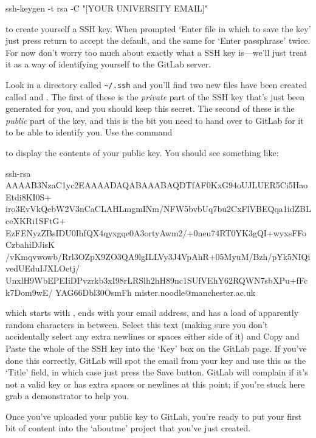\begin{ttoutenv}
ssh-keygen -t rsa -C "[YOUR UNIVERSITY EMAIL]"
\end{ttoutenv}

to create yourself a SSH key. When prompted `Enter file in which to save the key' just press return to accept the default, and the same for `Enter passphrase' twice.  For now don't worry too much about exactly what a SSH key is---we'll just treat it as a way of identifying yourself to the GitLab server. 

Look in a directory called \verb!~/.ssh! and you'll find two new files have been created called  and . The first of these is the \textit{private} part of the SSH key that's just been generated for you, and you should keep this secret. The second of these is the \textit{public} part of the key, and this is the bit you need to hand over to GitLab for it to be able to identify you. Use the command

to display the contents of your public key. You should see something like:

\begin{ttoutenv}
  
  ssh-rsa  AAAAB3NzaC1yc2EAAAADAQABAAABAQDTfAF0KxG94oUJLUER5Ci5HaoEtdi8KI0S+
  iro3EvVkQebW2V3nCaCLAHLmgmINm/NFW5bvbUq7bu2CxFlVBEQqa1idZBLceXKRi1SFtG+
  EzFENyzZBsIDU0IhfQX4qyxgqe0A3ortyAwm2/+0neu74RT0YK3gQI+wyxsFFoCzbahiDJisK
  /vKmqvwowb/Rrl3OZpX9ZO3QA9lgILLVy3J4VpAhR+05MyuM/Bzh/pYk5NIQivedUEduIJXLOetj/
  UnxlH9WbEPEIiDPvzrkb3xI98rLRSlh2hH89nc1SUfVEhY62RQWN7sbXPu+fFck7Dom9wE/
  YAG66Dbl30OsmFh mister.noodle@manchester.ac.uk

\end{ttoutenv}

which starts with , ends with your email address, and has a load of apparently random characters in between. Select this text (making sure you don't accidentally select any extra newlines or spaces either side of it) and 
Copy and Paste the whole of the SSH key into the `Key' box on the GitLab page. If you've done this correctly, GitLab will spot the email from your key and use this as the `Title' field, in which case just press the Save button. GitLab will complain if it's not a valid key or has extra spaces or newlines at this point; if you're stuck here grab a demonstrator to help you. 

Once you've uploaded your public key to GitLab, you're ready to put your first bit of content into the `aboutme' project that you've just created. 

